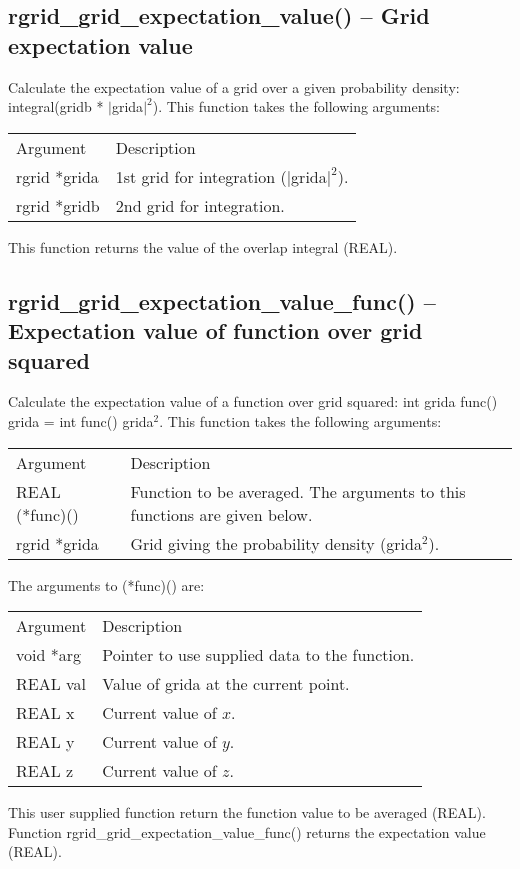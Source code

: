 \documentclass[12pt,letterpaper]{report}
\begin{document}
\subsection{rgrid\_grid\_expectation\_value() -- Grid expectation value}

Calculate the expectation value of a grid over a given probability density: integral(gridb * $|$grida$|^2$). This function takes the following arguments:
\begin{longtable}{p{} p{}}
Argument & Description\\
\cline{1-2}
rgrid *grida & 1st grid for integration ($|$grida$|^2$).\\
rgrid *gridb & 2nd grid for integration.\\
\end{longtable}
\noindent
This function returns the value of the overlap integral (REAL).

\subsection{rgrid\_grid\_expectation\_value\_func() -- Expectation value of function over grid squared}

Calculate the expectation value of a function over grid squared: int grida func() grida = int func() grida$^2$. This function takes the following arguments:
\begin{longtable}{p{} p{}}
Argument & Description\\
\cline{1-2}
REAL (*func)() & Function to be averaged. The arguments to this functions are given below.\\
rgrid *grida & Grid giving the probability density (grida$^2$).\\
\end{longtable}
\noindent
The arguments to (*func)() are:
\begin{longtable}{p{} p{}}
Argument & Description\\
\cline{1-2}
void *arg & Pointer to use supplied data to the function.\\
REAL val & Value of grida at the current point.\\
REAL x & Current value of $x$.\\
REAL y & Current value of $y$.\\
REAL z & Current value of $z$.\\
\end{longtable}
\noindent
This user supplied function return the function value to be averaged (REAL). Function rgrid\_grid\_expectation\_value\_func() returns the expectation value (REAL).
\end{document}
